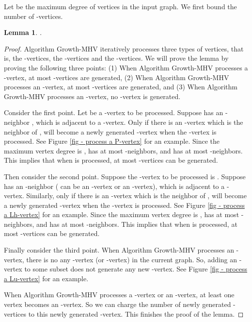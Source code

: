 \documentclass[11pt]{article}
\newtheorem{lemma}{Lemma}[section]
\newcommand{\qed}{\vrule height4pt width4pt depth2pt}
\begin{document}
Let  be the maximum degree of vertices in the input graph.
We first bound the number of -vertices.

\begin{lemma}
\label{lm - |L_u^new| <= Delta (Delta-2) |H^new|}
.
\end{lemma}
\begin{proof}
Algorithm {\sc Growth-MHV} iteratively processes three types of vertices,
that is, the -vertices, the -vertices and the -vertices.
We will prove the lemma by proving the following three points:
(1) When Algorithm {\sc Growth-MHV} processes a -vertex, at most
 -vertices are generated,
(2) When Algorithm {\sc Growth-MHV} processes an -vertex, at most
 -vertices are generated, and
(3) When Algorithm {\sc Growth-MHV} processes an -vertex,
no -vertex is generated.

Consider the first point. Let  be a -vertex to be processed.
Suppose  has an -neighbor , which is adjacent to a -vertex.
Only if there is an -vertex  which is the neighbor of ,
 will become a newly generated -vertex when the -vertex 
is processed. See Figure \ref{fig - process a P-vertex} for an example.
Since the maximum vertex degree is ,  has at most 
-neighbors, and  has at most  -neighbors.
This implies that when  is processed, at most 
-vertices can be generated.

Then consider the second point. Suppose the -vertex to be processed
is . Suppose  has an -neighbor  ( can be an -vertex or
an -vertex), which is adjacent to a -vertex. Similarly,
only if there is an -vertex  which is the neighbor of ,
 will become a newly generated -vertex when the -vertex 
is processed. See Figure \ref{fig - process a Lh-vertex} for an example.
Since the maximum vertex degree is ,  has at most 
-neighbors, and  has at most  -neighbors.
This implies that when  is processed, at most 
-vertices can be generated.

Finally consider the third point. When Algorithm {\sc Growth-MHV} processes
an -vertex, there is no any -vertex (or -vertex) in the
current graph. So, adding an -vertex to some subset 
does not generate any new -vertex.
See Figure \ref{fig - process a Lu-vertex} for an example.

When Algorithm {\sc Growth-MHV} processes a -vertex or an -vertex,
at least one vertex becomes an -vertex. So we can charge the number of
newly generated -vertices to this newly generated -vertex.
This finishes the proof of the lemma.
\qed
\end{proof}
\end{document}
